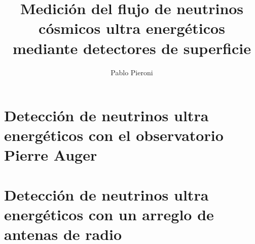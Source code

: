 \documentclass[a4paper,12pt]{book}
\title{Medición del flujo de neutrinos cósmicos ultra energéticos mediante detectores de superficie}
\author{Pablo Pieroni}
\begin{document}
\renewcommand{\listtablename}{Índice de tablas}
\renewcommand{\tablename}{Tabla} 




\newpage
\thispagestyle{empty}
\mbox{}

\newpage
\thispagestyle{empty}
\mbox{}

\newpage
\thispagestyle{empty}
\mbox{}

\maketitle
\tableofcontents



\part{Detecci\'on de neutrinos ultra energ\'eticos con el observatorio Pierre Auger}
% 
% 
% 
% 
% 

\part{Detecci\'on de neutrinos ultra energ\'eticos con un arreglo de antenas de radio}
% 
% 
% 


\appendix

% 
% 
% 
\end{document}

